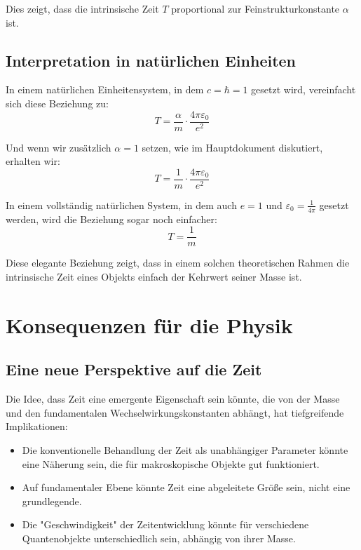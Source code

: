 \documentclass{article}
\begin{document}
	Dies zeigt, dass die intrinsische Zeit $T$ proportional zur Feinstrukturkonstante $\alpha$ ist.
	
	\subsection{Interpretation in natürlichen Einheiten}
	
	In einem natürlichen Einheitensystem, in dem $c = \hbar = 1$ gesetzt wird, vereinfacht sich diese Beziehung zu:
	\begin{equation}
		T = \frac{\alpha}{m} \cdot \frac{4\pi\varepsilon_0}{e^2}
	\end{equation}
	
	Und wenn wir zusätzlich $\alpha = 1$ setzen, wie im Hauptdokument diskutiert, erhalten wir:
	\begin{equation}
		T = \frac{1}{m} \cdot \frac{4\pi\varepsilon_0}{e^2}
	\end{equation}
	
	In einem vollständig natürlichen System, in dem auch $e = 1$ und $\varepsilon_0 = \frac{1}{4\pi}$ gesetzt werden, wird die Beziehung sogar noch einfacher:
	\begin{equation}
		T = \frac{1}{m}
	\end{equation}
	
	Diese elegante Beziehung zeigt, dass in einem solchen theoretischen Rahmen die intrinsische Zeit eines Objekts einfach der Kehrwert seiner Masse ist.
	
	\section{Konsequenzen für die Physik}
	
	\subsection{Eine neue Perspektive auf die Zeit}
	
	Die Idee, dass Zeit eine emergente Eigenschaft sein könnte, die von der Masse und den fundamentalen Wechselwirkungskonstanten abhängt, hat tiefgreifende Implikationen:
	\begin{itemize}
		\item Die konventionelle Behandlung der Zeit als unabhängiger Parameter könnte eine Näherung sein, die für makroskopische Objekte gut funktioniert.
		\item Auf fundamentaler Ebene könnte Zeit eine abgeleitete Größe sein, nicht eine grundlegende.
		\item Die "Geschwindigkeit" der Zeitentwicklung könnte für verschiedene Quantenobjekte unterschiedlich sein, abhängig von ihrer Masse.
	\end{itemize}
	
\end{document}
